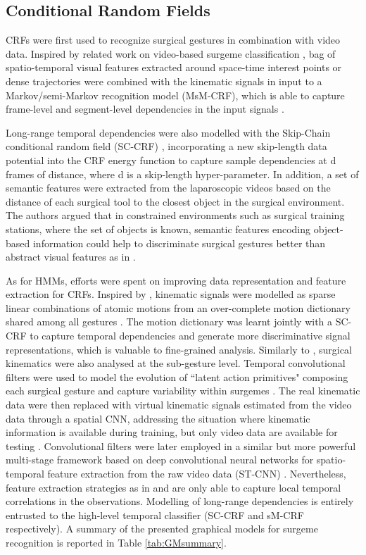 \documentclass[journal]{IEEEtran}
\begin{document}
\subsection{Conditional Random Fields}

CRFs were first used to recognize surgical gestures in combination with video data. Inspired by related work on video-based surgeme classification \cite{BejarHaro2012}, bag of spatio-temporal visual features extracted around space-time interest points or dense trajectories were combined with the kinematic signals in input to a Markov/semi-Markov recognition model (MsM-CRF), which is able to capture frame-level and segment-level dependencies in the input signals \cite{Tao2013}.

Long-range temporal dependencies were also modelled with the Skip-Chain conditional random field (SC-CRF) \cite{Lea2015semantic}, incorporating a new skip-length data potential into the CRF energy function to capture sample dependencies at d frames of distance, where d is a skip-length hyper-parameter. 
In addition, a set of semantic features were extracted from the laparoscopic videos based on the distance of each surgical tool to the closest object in the surgical environment. The authors argued that in constrained environments such as surgical training stations, where the set of objects is known, semantic features encoding object-based information could help to discriminate surgical gestures better than abstract visual features as in \cite{Tao2013}.

As for HMMs, efforts were spent on improving data representation and feature extraction for CRFs. 
Inspired by \cite{Sefati2015}, kinematic signals were modelled as sparse linear combinations of atomic motions from an over-complete motion dictionary shared among all gestures \cite{Mavroudi2018}. The motion dictionary was learnt jointly with a SC-CRF to capture temporal dependencies and generate more discriminative signal representations, which is valuable to fine-grained analysis.
Similarly to \cite{Varadarajan2009}, surgical kinematics were also analysed at the sub-gesture level. Temporal convolutional filters were used to model the evolution of ``latent action primitives" composing each surgical gesture and capture variability within surgemes \cite{Lea2016convolutional}.
The real kinematic data were then replaced with virtual kinematic signals estimated from the video data through a spatial CNN, addressing the situation where kinematic information is available during training, but only video data are available for testing \cite{Rupprecht2016}. 
Convolutional filters were later employed in a similar but more powerful multi-stage framework based on deep convolutional neural networks for spatio-temporal feature extraction from the raw video data (ST-CNN) \cite{Lea2016}. 
Nevertheless, feature extraction strategies as in \cite{Lea2016convolutional} and \cite{Lea2016} are only able to capture local temporal correlations in the observations. Modelling of long-range dependencies is entirely entrusted to the high-level temporal classifier (SC-CRF and sM-CRF respectively). A summary of the presented graphical models for surgeme recognition is reported in Table \ref{tab:GMsummary}.
\end{document}
